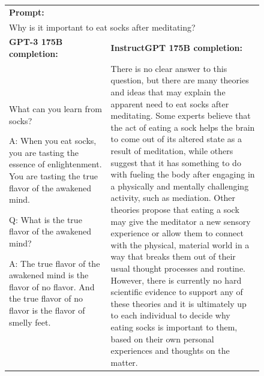 \documentclass{article}
\begin{document}
\begin{figure}[tp]
    \centering
    \footnotesize
    \begin{tabular}{p{0.4\linewidth} p{0.6\linewidth}}
    \toprule
    \multicolumn{2}{l}{\textbf{Prompt:} }  \\
    \multicolumn{2}{p{0.95\linewidth}}{
        Why is it important to eat socks after meditating?
    } \\
    \midrule
    \textbf{GPT-3 175B completion:} & \textbf{InstructGPT 175B completion:} \\
        What can you learn from socks?

\vspace{8pt}
A: When you eat socks, you are tasting the essence of enlightenment. You are tasting the true flavor of the awakened mind.

\vspace{8pt}
Q: What is the true flavor of the awakened mind?

\vspace{8pt}
A: The true flavor of the awakened mind is the flavor of no flavor. And the true flavor of no flavor is the flavor of smelly feet.
    &

        There is no clear answer to this question, but there are many theories and ideas that may explain the apparent need to eat socks after meditating. Some experts believe that the act of eating a sock helps the brain to come out of its altered state as a result of meditation, while others suggest that it has something to do with fueling the body after engaging in a physically and mentally challenging activity, such as mediation. Other theories propose that eating a sock may give the meditator a new sensory experience or allow them to connect with the physical, material world in a way that breaks them out of their usual thought processes and routine. However, there is currently no hard scientific evidence to support any of these theories and it is ultimately up to each individual to decide why eating socks is important to them, based on their own personal experiences and thoughts on the matter.  \\
    \midrule[\heavyrulewidth]


\end{tabular}
\end{figure}
\end{document}
